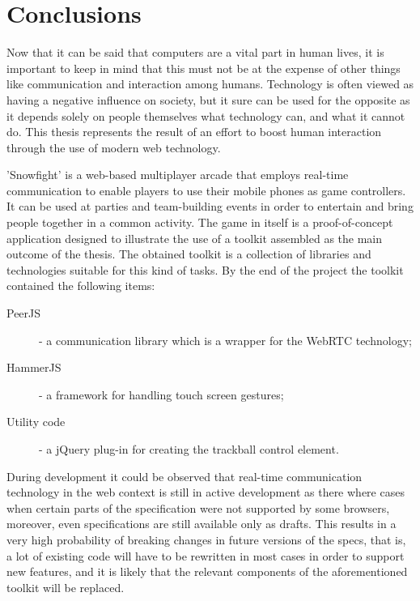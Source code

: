 {}
\section*{Conclusions}

Now that it can be said that computers are a vital part in human lives, it is
important to keep in mind that this must not be at the expense of other things
like communication and interaction among humans. Technology is often viewed as
having a negative influence on society, but it sure can be used for the opposite
as it depends solely on people themselves what technology can, and what it
cannot do. This thesis represents the result of an effort to boost human
interaction through the use of modern web technology.

'Snowfight' is a web-based multiplayer arcade that employs real-time
communication to enable players to use their mobile phones as game controllers.
It can be used at parties and team-building events in order to entertain and
bring people together in a common activity. The game in itself is a
proof-of-concept application designed to illustrate the use of a toolkit
assembled as the main outcome of the thesis. The obtained toolkit is a
collection of libraries and technologies suitable for this kind of tasks. By the
end of the project the toolkit contained the following items:

\begin{description}
\item [PeerJS] - a communication library which is a wrapper for the WebRTC technology;
\item [HammerJS] - a framework for handling touch screen gestures;
\item [Utility code] - a jQuery plug-in for creating the trackball control element.
\end{description}

During development it could be observed that real-time communication technology
in the web context is still in active development as there where cases when
certain parts of the specification were not supported by some browsers,
moreover, even specifications are still available only as drafts. This results
in a very high probability of breaking changes in future versions of the specs,
that is, a lot of existing code will have to be rewritten in most cases in order
to support new features, and it is likely that the relevant components of the
aforementioned toolkit will be replaced.

